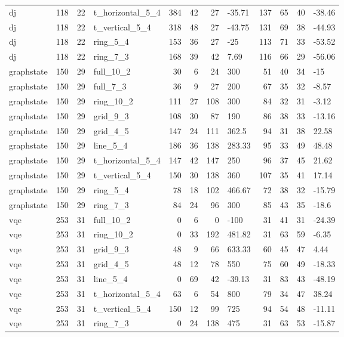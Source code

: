 \begin{longtable}{lrrlrrrlrrrl}
dj & 118 & 22 & t\_horizontal\_5\_4 & 384 & 42 & 27 & -35.71 & 137 & 65 & 40 & -38.46 \\
dj & 118 & 22 & t\_vertical\_5\_4 & 318 & 48 & 27 & -43.75 & 131 & 69 & 38 & -44.93 \\
dj & 118 & 22 & ring\_5\_4 & 153 & 36 & 27 & -25 & 113 & 71 & 33 & -53.52 \\
dj & 118 & 22 & ring\_7\_3 & 168 & 39 & 42 & 7.69 & 116 & 66 & 29 & -56.06 \\
graphstate & 150 & 29 & full\_10\_2 & 30 & 6 & 24 & 300 & 51 & 40 & 34 & -15 \\
graphstate & 150 & 29 & full\_7\_3 & 36 & 9 & 27 & 200 & 67 & 35 & 32 & -8.57 \\
graphstate & 150 & 29 & ring\_10\_2 & 111 & 27 & 108 & 300 & 84 & 32 & 31 & -3.12 \\
graphstate & 150 & 29 & grid\_9\_3 & 108 & 30 & 87 & 190 & 86 & 38 & 33 & -13.16 \\
graphstate & 150 & 29 & grid\_4\_5 & 147 & 24 & 111 & 362.5 & 94 & 31 & 38 & 22.58 \\
graphstate & 150 & 29 & line\_5\_4 & 186 & 36 & 138 & 283.33 & 95 & 33 & 49 & 48.48 \\
graphstate & 150 & 29 & t\_horizontal\_5\_4 & 147 & 42 & 147 & 250 & 96 & 37 & 45 & 21.62 \\
graphstate & 150 & 29 & t\_vertical\_5\_4 & 150 & 30 & 138 & 360 & 107 & 35 & 41 & 17.14 \\
graphstate & 150 & 29 & ring\_5\_4 & 78 & 18 & 102 & 466.67 & 72 & 38 & 32 & -15.79 \\
graphstate & 150 & 29 & ring\_7\_3 & 84 & 24 & 96 & 300 & 85 & 43 & 35 & -18.6 \\
vqe & 253 & 31 & full\_10\_2 & 0 & 6 & 0 & -100 & 31 & 41 & 31 & -24.39 \\
vqe & 253 & 31 & ring\_10\_2 & 0 & 33 & 192 & 481.82 & 31 & 63 & 59 & -6.35 \\
vqe & 253 & 31 & grid\_9\_3 & 48 & 9 & 66 & 633.33 & 60 & 45 & 47 & 4.44 \\
vqe & 253 & 31 & grid\_4\_5 & 48 & 12 & 78 & 550 & 75 & 60 & 49 & -18.33 \\
vqe & 253 & 31 & line\_5\_4 & 0 & 69 & 42 & -39.13 & 31 & 83 & 43 & -48.19 \\
vqe & 253 & 31 & t\_horizontal\_5\_4 & 63 & 6 & 54 & 800 & 79 & 34 & 47 & 38.24 \\
vqe & 253 & 31 & t\_vertical\_5\_4 & 150 & 12 & 99 & 725 & 94 & 54 & 48 & -11.11 \\
vqe & 253 & 31 & ring\_7\_3 & 0 & 24 & 138 & 475 & 31 & 63 & 53 & -15.87 \\

\end{longtable}
